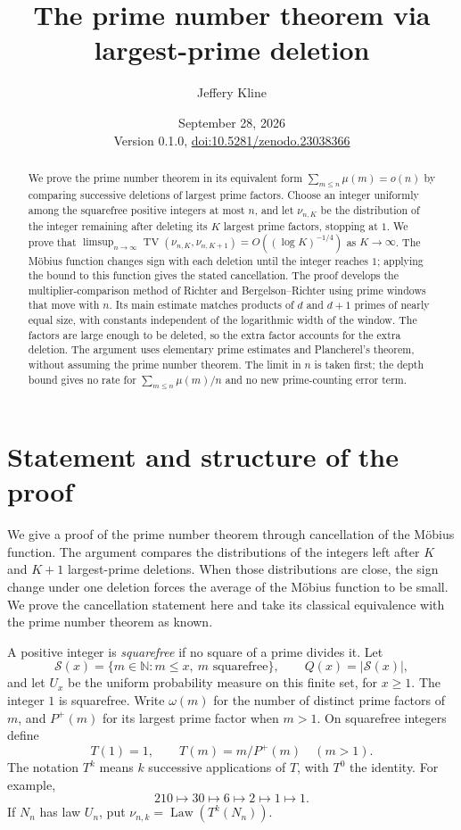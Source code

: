 \documentclass[11pt]{article}
\title{The prime number theorem via largest-prime deletion}
\author{Jeffery Kline}
\date{September 28, 2026\\[3pt]\small Version 0.1.0, \href{https://doi.org/10.5281/zenodo.23038366}{doi:10.5281/zenodo.23038366}}
\theoremstyle{remark}\newtheorem{remark}[theorem]{Remark}
\DeclareMathOperator{\TV}{TV}
\DeclareMathOperator{\Law}{Law}
\newcommand{\sfset}{\mathcal S}
\begin{document}
\maketitle
\begin{abstract}
We prove the prime number theorem in its equivalent form $\sum_{m\le n}\mu(m)=o(n)$ by comparing successive deletions of largest prime factors. Choose an integer uniformly among the squarefree positive integers at most $n$, and let $\nu_{n,K}$ be the distribution of the integer remaining after deleting its $K$ largest prime factors, stopping at $1$. We prove that $\limsup_{n\to\infty}\TV(\nu_{n,K},\nu_{n,K+1})=O((\log K)^{-1/4})$ as $K\to\infty$. The M\"obius function changes sign with each deletion until the integer reaches $1$; applying the bound to this function gives the stated cancellation. The proof develops the multiplier-comparison method of Richter and Bergelson--Richter using prime windows that move with $n$. Its main estimate matches products of $d$ and $d+1$ primes of nearly equal size, with constants independent of the logarithmic width of the window. The factors are large enough to be deleted, so the extra factor accounts for the extra deletion. The argument uses elementary prime estimates and Plancherel's theorem, without assuming the prime number theorem. The limit in $n$ is taken first; the depth bound gives no rate for $\sum_{m\le n}\mu(m)/n$ and no new prime-counting error term.
\end{abstract}

\section{Statement and structure of the proof}

We give a proof of the prime number theorem through cancellation of the M\"obius function. The argument compares the distributions of the integers left after $K$ and $K+1$ largest-prime deletions. When those distributions are close, the sign change under one deletion forces the average of the M\"obius function to be small. We prove the cancellation statement here and take its classical equivalence with the prime number theorem as known.

A positive integer is \emph{squarefree} if no square of a prime divides it. Let
\[
 \sfset(x)=\{m\in\mathbb N:m\le x,\ m\text{ squarefree}\},
 \qquad Q(x)=|\sfset(x)|,
\]
and let $U_x$ be the uniform probability measure on this finite set, for $x\ge1$. The integer $1$ is squarefree. Write $\omega(m)$ for the number of distinct prime factors of $m$, and $P^+(m)$ for its largest prime factor when $m>1$. On squarefree integers define
\[
 T(1)=1,\qquad T(m)=m/P^+(m)\quad(m>1).
\]
The notation $T^k$ means $k$ successive applications of $T$, with $T^0$ the identity. For example,
\[
 210\longmapsto30\longmapsto6\longmapsto2\longmapsto1\longmapsto1.
\]
If $N_n$ has law $U_n$, put $\nu_{n,k}=\Law(T^k(N_n))$.
\end{document}
